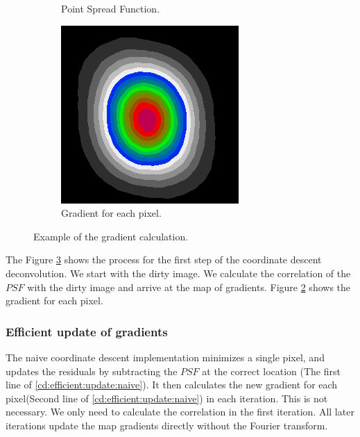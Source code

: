 \begin{figure}[h]
\begin{subfigure}[b]{0.3\linewidth}
		\caption{Point Spread Function.}
		\label{cd:efficient:gradients:psf}
	\end{subfigure}
	\begin{subfigure}[b]{0.3\linewidth}
		\includegraphics[width=\linewidth]{./chapters/03.distribution/simulated/gradients.png}
		\caption{Gradient for each pixel.}
		\label{cd:efficient:gradients:gradients}
	\end{subfigure}
	
	\caption{Example of the gradient calculation.}
	\label{cd:efficient:gradients:figure}
\end{figure}

The Figure \ref{cd:efficient:gradients:figure} shows the process for the first step of the coordinate descent deconvolution. We start with the dirty image. We calculate the correlation of the $PSF$ with the dirty image and arrive at the map of gradients. Figure \ref{cd:efficient:gradients:gradients} shows the gradient for each pixel.

\subsubsection{Efficient update of gradients}\label{cd:efficient:update}
The naive coordinate descent implementation minimizes a single pixel, and updates the residuals by subtracting the $PSF$ at the correct location (The first line of \eqref{cd:efficient:update:naive}). It then calculates the new gradient for each pixel(Second line of \eqref{cd:efficient:update:naive}) in each iteration. This is not necessary. We only need to calculate the correlation in the first iteration. All later iterations update the map gradients directly without the Fourier transform.

